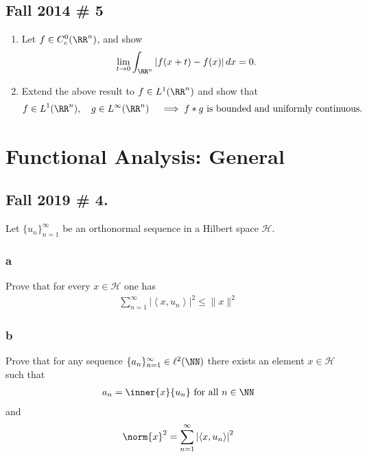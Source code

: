 \hypertarget{fall-2014-5}{%
\subsection{Fall 2014 \# 5}\label{fall-2014-5}}

\begin{enumerate}
\def\labelenumi{\arabic{enumi}.}
\item
  Let \(f \in C_c^0(\RR^n)\), and show
  \begin{align*}
  \lim _{t \to 0} \int_{\RR^n} |f(x+t) - f(x)| \, dx = 0
  .\end{align*}
\item
  Extend the above result to \(f\in L^1(\RR^n)\) and show that
  \begin{align*}
  f\in L^1(\RR^n), \quad g\in L^\infty(\RR^n) \quad
  \implies f \ast g \text{ is bounded and uniformly continuous. }
  \end{align*}
\end{enumerate}

\hypertarget{functional-analysis-general}{%
\section{Functional Analysis:
General}\label{functional-analysis-general}}

\hypertarget{fall-2019-4.}{%
\subsection{Fall 2019 \# 4.}\label{fall-2019-4.}}

Let \(\{u_n\}_{n=1}^∞\) be an orthonormal sequence in a Hilbert space
\(\mathcal{H}\).

\hypertarget{a-19}{%
\subsubsection{a}\label{a-19}}

Prove that for every \(x ∈ \mathcal H\) one has
\begin{align*}
\displaystyle\sum_{n=1}^{\infty}\left|\left\langle x, u_{n}\right\rangle\right|^{2} \leq\|x\|^{2}
\end{align*}

\hypertarget{b-18}{%
\subsubsection{b}\label{b-18}}

Prove that for any sequence \(\{a_n\}_{n=1}^\infty \in \ell^2(\NN)\)
there exists an element \(x\in\mathcal H\) such that
\begin{align*}
a_n = \inner{x}{u_n} \text{ for all } n\in \NN
\end{align*} and
\begin{align*}
\norm{x}^2 = \sum_{n=1}^{\infty}\left|\left\langle x, u_{n}\right\rangle\right|^{2}
\end{align*}

